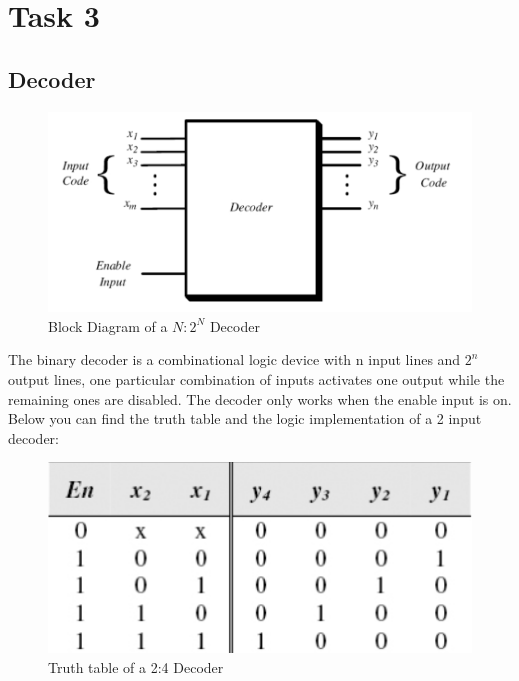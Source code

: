 

\section*{Task 3}

\subsection*{Decoder}

\begin{figure}[H]
  \begin{centering}
  \includegraphics[scale=1]{data/decoder.png}
  \par\end{centering}
  \caption{Block Diagram of a $N:2^{N}$ Decoder}
\end{figure}


The binary decoder is a combinational logic device with n input lines and $2^{n}$ output lines, one particular combination of inputs activates one output while the remaining ones are disabled. The decoder only works when the enable input is on. Below you can find the truth table and the logic implementation of a 2 input decoder:

\begin{figure}[H]
  \begin{centering}
  \includegraphics[scale=1]{data/decodertable.png}
  \par\end{centering}
  \caption{Truth table of a 2:4 Decoder}
\end{figure}


